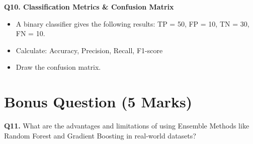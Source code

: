 \documentclass[12pt]{article}
\begin{document}
\textbf{Q10. Classification Metrics \& Confusion Matrix}
\begin{itemize}
  \item A binary classifier gives the following results: TP = 50, FP = 10, TN = 30, FN = 10.
  \item Calculate: Accuracy, Precision, Recall, F1-score
  \item Draw the confusion matrix.
\end{itemize}

\section*{Bonus Question (5 Marks)}
\textbf{Q11.} What are the advantages and limitations of using Ensemble Methods like Random Forest and Gradient Boosting in real-world datasets?
\end{document}
